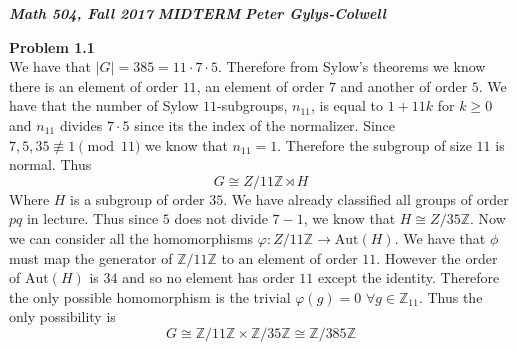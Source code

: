 \documentclass[12pt]{article}
\newenvironment{ques}[1]{\textbf{Problem #1}\vspace{1 mm}\\ }{\bigskip}
\theoremstyle{definition}
\newcommand{\Z}{\mathbb Z}
\begin{document}
\noindent \textit{\textbf{Math 504, Fall 2017}} \hspace{1.3cm}
\textit{\textbf{MIDTERM}} \hspace{1.3cm} \textit{\textbf{Peter
Gylys-Colwell}} 

\vspace{1cm}

\begin{ques}{1.1}
	We have that $|G| = 385 = 11 \cdot 7 \cdot 5$. Therefore from Sylow's theorems we
	know there is an element of order $11$, an element of order $7$ and another
	of order $5$. We have that the number of Sylow $11$-subgroups, $n_{11}$, is
	equal to $1 + 11k$ for $k \geq 0$ and $n_{11}$ divides $7 \cdot 5$ since
	its the index of the normalizer. Since $7,5,35 \not \equiv 1 \pmod {11}$ we
	know that $n_{11} = 1$. Therefore the subgroup of size $11$ is normal. Thus
	$$G \cong  Z/ 11\Z \rtimes H$$
	Where $H$ is a subgroup of order $35$. We have already classified all
	groups of order $pq$ in lecture. Thus since $5$ does not divide $7
	- 1$, we know that $H \cong Z/35\Z$.
	Now we can consider all the homomorphisms $\varphi :Z/11\Z \to
	\text{Aut}(H)$. We have that $\phi$ must map the generator of $\Z/11\Z$ to an
	element of order $11$. However the order of $\text{Aut}(H)$ is $34$ and so
	no element has order $11$ except the identity. Therefore the only possible
	homomorphism is the trivial $\varphi(g) = 0$ $\forall g \in \Z_{11}$. Thus
	the only possibility is
	$$G \cong \Z/11\Z \times \Z/35\Z \cong \Z/385\Z$$
\end{ques}
\end{document}
